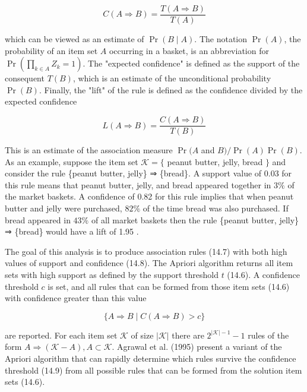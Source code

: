 \documentclass[10pt]{article}
\begin{document}
\begin{equation*}
C(A \Rightarrow B)=\frac{T(A \Rightarrow B)}{T(A)} \tag{14.8}
\end{equation*}


which can be viewed as an estimate of $\operatorname{Pr}(B \mid A)$. The notation $\operatorname{Pr}(A)$, the probability of an item set $A$ occurring in a basket, is an abbreviation for\\
$\operatorname{Pr}\left(\prod_{k \in A} Z_{k}=1\right)$. The "expected confidence" is defined as the support of the consequent $T(B)$, which is an estimate of the unconditional probability $\operatorname{Pr}(B)$. Finally, the "lift" of the rule is defined as the confidence divided by the expected confidence

$$
L(A \Rightarrow B)=\frac{C(A \Rightarrow B)}{T(B)}
$$

This is an estimate of the association measure $\operatorname{Pr}(A$ and $B) / \operatorname{Pr}(A) \operatorname{Pr}(B)$.\\
As an example, suppose the item set $\mathcal{K}=\{$ peanut butter, jelly, bread $\}$ and consider the rule \{peanut butter, jelly\} ⇒ \{bread\}. A support value of 0.03 for this rule means that peanut butter, jelly, and bread appeared together in $3 \%$ of the market baskets. A confidence of 0.82 for this rule implies that when peanut butter and jelly were purchased, $82 \%$ of the time bread was also purchased. If bread appeared in $43 \%$ of all market baskets then the rule \{peanut butter, jelly\} ⇒ \{bread\} would have a lift of 1.95 .

The goal of this analysis is to produce association rules (14.7) with both high values of support and confidence (14.8). The Apriori algorithm returns all item sets with high support as defined by the support threshold $t$ (14.6). A confidence threshold $c$ is set, and all rules that can be formed from those item sets (14.6) with confidence greater than this value


\begin{equation*}
\{A \Rightarrow B \mid C(A \Rightarrow B)>c\} \tag{14.9}
\end{equation*}


are reported. For each item set $\mathcal{K}$ of size $|\mathcal{K}|$ there are $2^{|\mathcal{K}|-1}-1$ rules of the form $A \Rightarrow(\mathcal{K}-A), A \subset \mathcal{K}$. Agrawal et al. (1995) present a variant of the Apriori algorithm that can rapidly determine which rules survive the confidence threshold (14.9) from all possible rules that can be formed from the solution item sets (14.6).
\end{document}
